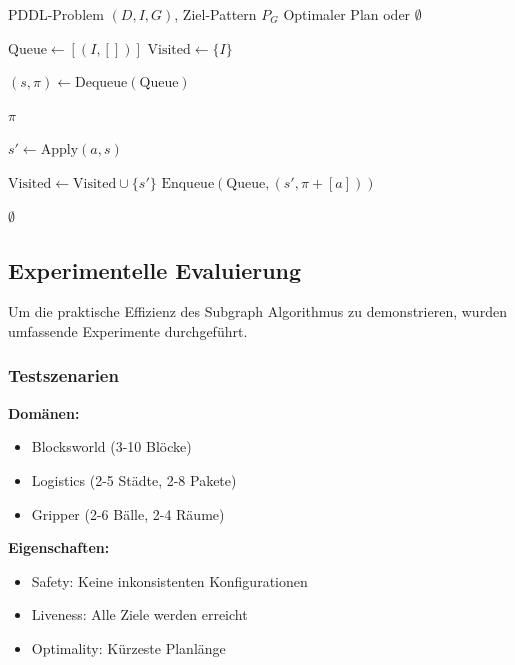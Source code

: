 ﻿\documentclass[a4paper,12pt]{article}
\theoremstyle{definition}
\begin{document}
\begin{algorithm}[H]
	\caption{Subgraph-basierte optimale Plansuche}
	\label{alg:optimal_planning}
	\begin{algorithmic}[1]
		\Eingabe PDDL-Problem $(D, I, G)$, Ziel-Pattern $P_G$
		\Ausgabe Optimaler Plan oder $\emptyset$
		
		\State $\text{Queue} \gets [(I, [])]$ 
		\State $\text{Visited} \gets \{I\}$
		
		\State $(s, \pi) \gets \text{Dequeue}(\text{Queue})$
		
		 
		\State \Return $\pi$ 
		\EndeWenn
		
		\State $s' \gets \text{Apply}(a, s)$
		
		\State $\text{Visited} \gets \text{Visited} \cup \{s'\}$
		\State $\text{Enqueue}(\text{Queue}, (s', \pi + [a]))$
		\EndeWenn
		\EndeFuer
		\EndeWaehrend
		
		\State \Return $\emptyset$ 
	\end{algorithmic}
\end{algorithm}

\subsection{Experimentelle Evaluierung}

Um die praktische Effizienz des Subgraph Algorithmus zu demonstrieren, wurden umfassende Experimente durchgeführt.

\subsubsection{Testszenarien}

\textbf{Domänen:}
\begin{itemize}
	\item[-] Blocksworld (3-10 Blöcke)
	\item[-] Logistics (2-5 Städte, 2-8 Pakete)
	\item[-] Gripper (2-6 Bälle, 2-4 Räume)
\end{itemize}

\textbf{Eigenschaften:}
\begin{itemize}
	\item[-] Safety: Keine inkonsistenten Konfigurationen
	\item[-] Liveness: Alle Ziele werden erreicht
	\item[-] Optimality: Kürzeste Planlänge
\end{itemize}
\end{document}
